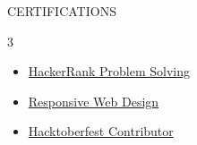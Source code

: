 \documentclass{resume} %
\begin{document}
\begin{rSection}{CERTIFICATIONS}
    \vspace{-0.3em}
    \begin{multicols}{3}
        \begin{itemize}
            \itemsep -2pt
            \item \href{https://www.hackerrank.com/certificates/73bb80c83be4}{HackerRank Problem Solving}
            \item \href{https://www.freecodecamp.org/certification/Roshan_kumar7989/responsive-web-design}{Responsive Web Design}
            \item \href{https://tree-nation.com/certificate/6525e97fbca2d}{Hacktoberfest Contributor}
        \end{itemize}
    \end{multicols}
\end{rSection}
\end{document}
